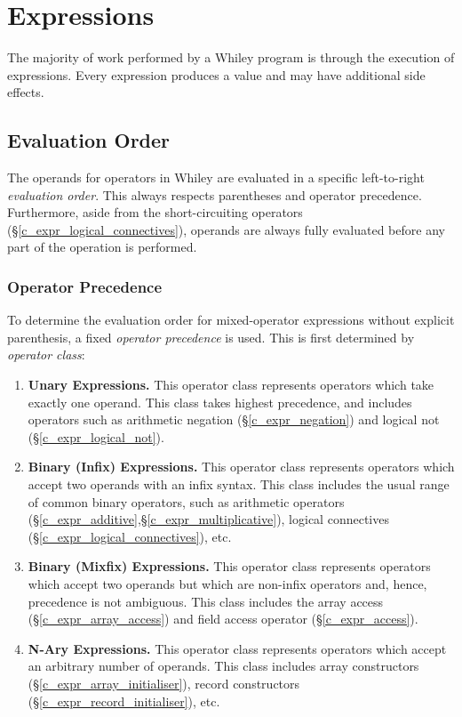 
\chapter{Expressions}
\label{c_expressions}
The majority of work performed by a Whiley program is through the execution of \glspl{expression}.  Every expression produces a \gls{value} and may have additional side effects.

\section{Evaluation Order}

The operands for operators in Whiley are evaluated in a specific left-to-right {\em evaluation order}.  This always respects parentheses and operator precedence.  Furthermore, aside from the short-circuiting operators (\S\ref{c_expr_logical_connectives}), operands are always fully evaluated before any part of the operation is performed.

\subsection{Operator Precedence}

To determine the evaluation order for mixed-operator expressions without explicit parenthesis, a fixed {\em operator precedence} is used.  This is first determined by {\em operator class}:

\begin{enumerate}
\item {\bf Unary Expressions.} This operator class represents operators which take exactly one operand.  This class takes highest precedence, and includes operators such as arithmetic negation (\S\ref{c_expr_negation}) and logical not (\S\ref{c_expr_logical_not}).
\item {\bf Binary (Infix) Expressions.}  This operator class represents operators which accept two operands with an infix syntax.  This class includes the usual range of common binary operators, such as arithmetic operators (\S\ref{c_expr_additive},\S\ref{c_expr_multiplicative}), logical connectives (\S\ref{c_expr_logical_connectives}), etc.

\item {\bf Binary (Mixfix) Expressions.}  This operator class represents operators which accept two operands but which are non-infix operators and, hence, precedence is not ambiguous.  This class includes the array access (\S\ref{c_expr_array_access}) and field access operator (\S\ref{c_expr_access}).
\item {\bf N-Ary Expressions.}  This operator class represents operators which accept an arbitrary number of operands.  This class includes array constructors (\S\ref{c_expr_array_initialiser}), record constructors (\S\ref{c_expr_record_initialiser}), etc.
\end{enumerate}

